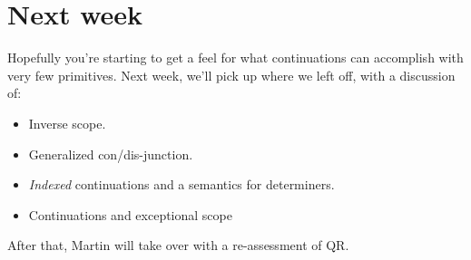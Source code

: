 \documentclass[nols,twoside,nofonts,nobib,nohyper]{tufte-handout}
\begin{document}




\section{Next week}

Hopefully you're starting to get a feel for what continuations can accomplish
with very few primitives. Next week, we'll pick up where we left off, with a
discussion of:

\begin{itemize}

  \item Inverse scope.

  \item Generalized con/dis-junction.

  \item \textit{Indexed} continuations and a semantics for determiners.

  \item Continuations and exceptional scope

\end{itemize}

After that, Martin will take over with a re-assessment of QR.

\printbibliography
\end{document}
